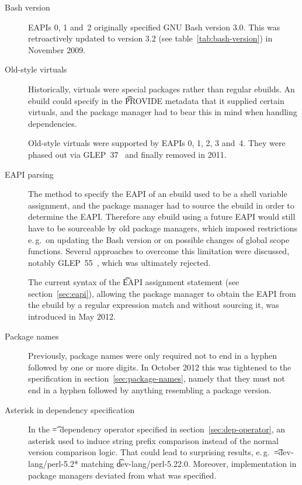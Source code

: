 \begin{description}
\item[Bash version]
EAPIs 0, 1 and~2 originally specified GNU Bash version 3.0. This was retroactively updated to
version 3.2 (see table~\ref{tab:bash-version}) in November 2009.

\item[Old-style virtuals]
Historically, virtuals were special packages rather than regular ebuilds. An ebuild could specify in
the \t{PROVIDE} metadata that it supplied certain virtuals, and the package manager had to bear this
in mind when handling dependencies.

Old-style virtuals were supported by EAPIs 0, 1, 2, 3 and~4. They were phased out via
GLEP~37~\cite{glep37} and finally removed in 2011.


\item[EAPI parsing]
The method to specify the EAPI of an ebuild used to be a shell variable assignment, and the package
manager had to source the ebuild in order to determine the EAPI\@. Therefore any ebuild using
a future EAPI would still have to be sourceable by old package managers, which imposed restrictions
e.\,g.\ on updating the Bash version or on possible changes of global scope functions. Several
approaches to overcome this limitation were discussed, notably GLEP~55~\cite{glep55}, which was
ultimately rejected.

The current syntax of the \t{EAPI} assignment statement (see section~\ref{sec:eapi}), allowing
the package manager to obtain the EAPI from the ebuild by a regular expression match and without
sourcing it, was introduced in May 2012.

\item[Package names]
Previously, package names were only required not to end in a hyphen followed by one or more digits.
In October 2012 this was tightened to the specification in section~\ref{sec:package-names}, namely
that they must not end in a hyphen followed by anything resembling a package version.

\item[Asterisk in dependency specification]
In the \t{=} dependency operator specified in section~\ref{sec:dep-operator}, an asterisk used to
induce string prefix comparison instead of the normal version comparison logic. That could lead to
surprising results, e.\,g.\ \t{=dev-lang/perl-5.2*} matching \t{dev-lang/perl-5.22.0}. Moreover,
implementation in package managers deviated from what was specified.


\end{description}
